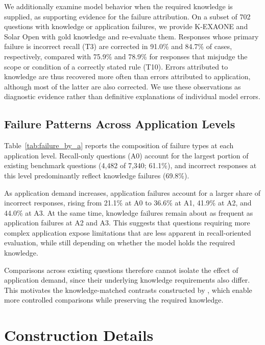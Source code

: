 We additionally examine model behavior when the required knowledge is supplied, as supporting evidence for the failure attribution.
On a subset of 702 questions with knowledge or application failures, we provide K-EXAONE and Solar Open with gold knowledge and re-evaluate them.
Responses whose primary failure is incorrect recall (T3) are corrected in 91.0\% and 84.7\% of cases, respectively, compared with 75.9\% and 78.9\% for responses that misjudge the scope or condition of a correctly stated rule (T10).
Errors attributed to knowledge are thus recovered more often than errors attributed to application, although most of the latter are also corrected.
We use these observations as diagnostic evidence rather than definitive explanations of individual model errors.

\subsection{Failure Patterns Across Application Levels}

Table~\ref{tab:failure_by_a} reports the composition of failure types at each application level.
Recall-only questions (A0) account for the largest portion of existing benchmark questions (4,482 of 7,340; 61.1\%), and incorrect responses at this level predominantly reflect knowledge failures (69.8\%).



As application demand increases, application failures account for a larger share of incorrect responses, rising from 21.1\% at A0 to 36.6\% at A1, 41.9\% at A2, and 44.0\% at A3.
At the same time, knowledge failures remain about as frequent as application failures at A2 and A3.
This suggests that questions requiring more complex application expose limitations that are less apparent in recall-oriented evaluation, while still depending on whether the model holds the required knowledge.

Comparisons across existing questions therefore cannot isolate the effect of application demand, since their underlying knowledge requirements also differ.
This motivates the knowledge-matched contrasts constructed by \name{}, which enable more controlled comparisons while preserving the required knowledge.


\section{\name{} Construction Details}
\label{app:construction_details}

